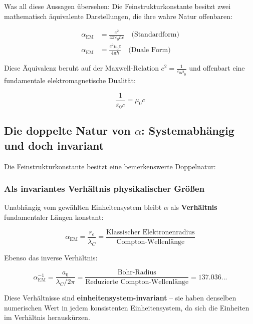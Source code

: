 Was all diese Aussagen übersehen: Die Feinstrukturkonstante besitzt zwei mathematisch äquivalente Darstellungen, die ihre wahre Natur offenbaren:

\begin{align}
	\alpha_{\text{EM}} &= \frac{e^2}{4\pi\varepsilon_0\hbar c} \quad \text{(Standardform)} \label{eq:alpha_standard}\\
	\alpha_{\text{EM}} &= \frac{e^2 \mu_0 c}{4\pi \hbar} \quad \text{(Duale Form)} \label{eq:alpha_dual}
\end{align}

Diese Äquivalenz beruht auf der Maxwell-Relation $c^2 = \frac{1}{\varepsilon_0\mu_0}$ und offenbart eine fundamentale elektromagnetische Dualität:

\begin{equation}
	\frac{1}{\varepsilon_0 c} = \mu_0 c
	\label{eq:em_duality}
\end{equation}

\subsection{Die doppelte Natur von $\alpha$: Systemabhängig und doch invariant}
\label{subsec:double_nature}

Die Feinstrukturkonstante besitzt eine bemerkenswerte Doppelnatur:

\subsubsection{Als invariantes Verhältnis physikalischer Größen}
\label{subsubsec:invariant_ratio}

Unabhängig vom gewählten Einheitensystem bleibt $\alpha$ als \textbf{Verhältnis} fundamentaler Längen konstant:

\begin{equation}
	\alpha_{\text{EM}} = \frac{r_e}{\lambda_C} = \frac{\text{Klassischer Elektronenradius}}{\text{Compton-Wellenlänge}}
	\label{eq:alpha_ratio_re}
\end{equation}

Ebenso das inverse Verhältnis:

\begin{equation}
	\alpha_{\text{EM}}^{-1} = \frac{a_0}{\lambda_C/2\pi} = \frac{\text{Bohr-Radius}}{\text{Reduzierte Compton-Wellenlänge}} = 137.036...
	\label{eq:alpha_ratio_bohr}
\end{equation}

Diese Verhältnisse sind \textbf{einheitensystem-invariant} -- sie haben denselben numerischen Wert in jedem konsistenten Einheitensystem, da sich die Einheiten im Verhältnis herauskürzen.


